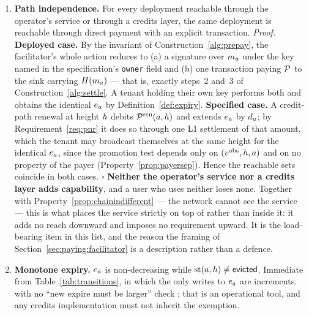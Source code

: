 \begin{enumerate}
\item\label{inv:pathindep} \textbf{Path independence.} For every deployment reachable through the
operator's service or through a credits layer, the same deployment is reachable through direct
payment with an explicit transaction.
\emph{Proof.} \textbf{Deployed case.} By the invariant of Construction~\ref{alg:prepay}, the
facilitator's whole action reduces to (a) a signature over $m_{a}$ under the key named in the
specification's \texttt{owner} field and (b) one transaction paying $\mathcal{P}$ to the sink carrying
$H(m_{a})$ --- that is, exactly steps~2 and~3 of Construction~\ref{alg:settle}. A tenant holding
their own key performs both and obtains the identical $e_{a}$ by Definition~\ref{def:expiry}.
\textbf{Specified case.} A credit-path renewal at height $h$ debits
$\mathcal{P}^{\mathrm{ren}}(a,h)$ and extends $e_{a}$ by $d_{a}$; by
Requirement~\ref{req:pnr} it does so through one L1 settlement of that amount, which the tenant may
broadcast themselves at the same height for the identical $e_{a}$, since the promotion test depends
only on $(v^{\mathrm{obs}}, h, a)$ and on no property of the payer
(Property~\ref{prop:payersep}). Hence the reachable sets coincide in both cases. $\square$
\textbf{Neither the operator's service nor a credits layer adds capability}, and a user who uses
neither loses none. Together with Property~\ref{prop:chainindifferent} --- the network cannot see the
service --- this is what places the service strictly on top of \Flux rather than inside it: it adds
no reach downward and imposes no requirement upward. It is the load-bearing item in this list, and
the reason the framing of Section~\ref{sec:paying:facilitator} is a description rather than a
defence.

\item\label{inv:monotone} \textbf{Monotone expiry.} $e_{a}$ is non-decreasing while
$\mathrm{st}(a,h) \ne \textsf{evicted}$. Immediate from Table~\ref{tab:transitions}, in which
the only writes to $e_{a}$ are increments.  with no ``new expire must be larger'' check
; that is an operational tool, and any
credits implementation must not inherit the exemption.
\end{enumerate}


